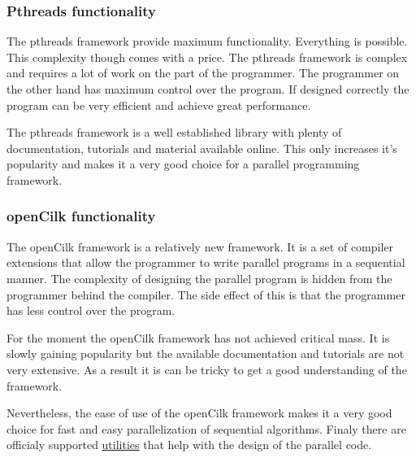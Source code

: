 \subsubsection*{Pthreads functionality}

The pthreads framework provide maximum functionality. Everything is possible.
This complexity though comes with a price. The pthreads framework is complex
and requires a lot of work on the part of the programmer. The programmer on the
other hand has maximum control over the program. If designed correctly the program
can be very efficient and achieve great performance.

The pthreads framework is a well established library with plenty of documentation,
tutorials and material available online. This only increases it's popularity and
makes it a very good choice for a parallel programming framework.

\subsubsection*{openCilk functionality}

The openCilk framework is a relatively new framework. It is a set of compiler extensions
that allow the programmer to write parallel programs in a sequential manner. The complexity
of designing the parallel program is hidden from the programmer behind the compiler. The side
effect of this is that the programmer has less control over the program.

For the moment the openCilk framework has not achieved critical mass. It is slowly gaining
popularity but the available documentation and tutorials are not very extensive. As a result
it is can be tricky to get a good understanding of the framework.

Nevertheless, the ease of use of the openCilk framework makes it a very good choice for fast
and easy parallelization of sequential algorithms. Finaly there are officialy supported 
\href{https://www.opencilk.org/doc/users-guide/cilkscale/}{utilities} that help with the design
of the parallel code. 
